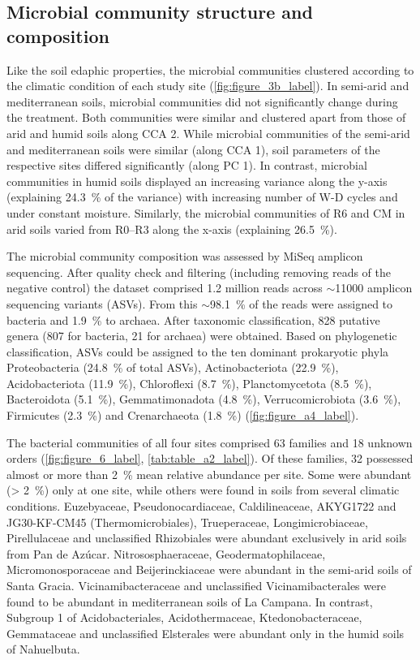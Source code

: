 \subsection{Microbial community structure and composition}

Like the soil edaphic properties, the microbial communities clustered according to the climatic condition of each study site (\cref{fig:figure_3b_label}). 
In semi-arid and mediterranean soils, microbial communities did not significantly change during the treatment. 
Both communities were similar and clustered apart from those of arid and humid soils along CCA 2. 
While microbial communities of the semi-arid and mediterranean soils were similar (along CCA 1), soil parameters of the respective sites differed significantly (along PC 1). 
In contrast, microbial communities in humid soils displayed an increasing variance along the y-axis (explaining \SI{24.3}{\percent} of the variance) with increasing number of W-D cycles and under constant moisture. 
Similarly, the microbial communities of R6 and CM in arid soils varied from R0--R3 along the x-axis (explaining \SI{26.5}{\percent}).

The microbial community composition was assessed by MiSeq amplicon sequencing. 
After quality check and filtering (including removing reads of the negative control) the dataset comprised 1.2 million reads across \(\sim\)\num{11000} amplicon sequencing variants (ASVs). 
From this \(\sim\)\SI{98.1}{\percent} of the reads were assigned to bacteria and \SI{1.9}{\percent} to archaea. 
After taxonomic classification, 828 putative genera (807 for bacteria, 21 for archaea) were obtained. 
Based on phylogenetic classification, ASVs could be assigned to the ten dominant prokaryotic phyla Proteobacteria (\SI{24.8}{\percent} of total ASVs), Actinobacteriota (\SI{22.9}{\percent}), Acidobacteriota (\SI{11.9}{\percent}), Chloroflexi (\SI{8.7}{\percent}), Planctomycetota (\SI{8.5}{\percent}), Bacteroidota (\SI{5.1}{\percent}), Gemmatimonadota (\SI{4.8}{\percent}), Verrucomicrobiota (\SI{3.6}{\percent}), Firmicutes (\SI{2.3}{\percent}) and Crenarchaeota (\SI{1.8}{\percent}) (\cref{fig:figure_a4_label}).

The bacterial communities of all four sites comprised 63 families and 18 unknown orders (\cref{fig:figure_6_label}, \cref{tab:table_a2_label}). 
Of these families, 32 possessed almost or more than \SI{2}{\percent} mean relative abundance per site. 
Some were abundant (\SI{> 2}{\percent}) only at one site, while others were found in soils from several climatic conditions. 
Euzebyaceae, Pseudonocardiaceae, Caldilineaceae, AKYG1722 and JG30-KF-CM45 (Thermomicrobiales), Trueperaceae, Longimicrobiaceae, Pirellulaceae and unclassified Rhizobiales were abundant exclusively in arid soils from Pan de Az{\'u}car. 
Nitrososphaeraceae, Geodermatophilaceae, Micromonosporaceae and Beijerinckiaceae were abundant in the semi-arid soils of Santa Gracia. 
Vicinamibacteraceae and unclassified Vicinamibacterales were found to be abundant in mediterranean soils of La Campana. 
In contrast, Subgroup 1 of Acidobacteriales, Acidothermaceae, Ktedonobacteraceae, Gemmataceae and unclassified Elsterales were abundant only in the humid soils of Nahuelbuta.

